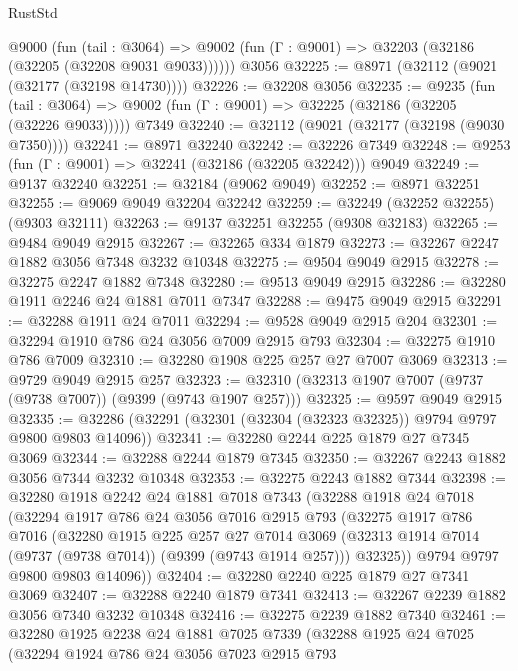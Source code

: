 \begin{lexlean}{RustStd}
\begin{coremodule}
    @9000
      (fun (tail : @3064) =>
      @9002 (fun (Γ : @9001) => @32203 (@32186 (@32205 (@32208 @9031 @9033))))))
    @3056
@32225 := @8971 (@32112 (@9021 (@32177 (@32198 @14730))))
@32226 := @32208 @3056
@32235 := @9235
    (fun (tail : @3064) => @9002 (fun (Γ : @9001) => @32225 (@32186 (@32205 (@32226 @9033)))))
    @7349
@32240 := @32112 (@9021 (@32177 (@32198 (@9030 @7350))))
@32241 := @8971 @32240
@32242 := @32226 @7349
@32248 := @9253 (fun (Γ : @9001) => @32241 (@32186 (@32205 @32242))) @9049
@32249 := @9137 @32240
@32251 := @32184 (@9062 @9049)
@32252 := @8971 @32251
@32255 := @9069 @9049 @32204 @32242
@32259 := @32249 (@32252 @32255) (@9303 @32111)
@32263 := @9137 @32251 @32255 (@9308 @32183)
@32265 := @9484 @9049 @2915
@32267 := @32265 @334 @1879
@32273 := @32267 @2247 @1882 @3056 @7348 @3232 @10348
@32275 := @9504 @9049 @2915
@32278 := @32275 @2247 @1882 @7348
@32280 := @9513 @9049 @2915
@32286 := @32280 @1911 @2246 @24 @1881 @7011 @7347
@32288 := @9475 @9049 @2915
@32291 := @32288 @1911 @24 @7011
@32294 := @9528 @9049 @2915 @204
@32301 := @32294 @1910 @786 @24 @3056 @7009 @2915 @793
@32304 := @32275 @1910 @786 @7009
@32310 := @32280 @1908 @225 @257 @27 @7007 @3069
@32313 := @9729 @9049 @2915 @257
@32323 := @32310 (@32313 @1907 @7007 (@9737 (@9738 @7007)) (@9399 (@9743 @1907 @257)))
@32325 := @9597 @9049 @2915
@32335 := @32286 (@32291 (@32301 (@32304 (@32323 @32325)) @9794 @9797 @9800 @9803 @14096))
@32341 := @32280 @2244 @225 @1879 @27 @7345 @3069
@32344 := @32288 @2244 @1879 @7345
@32350 := @32267 @2243 @1882 @3056 @7344 @3232 @10348
@32353 := @32275 @2243 @1882 @7344
@32398 := @32280
    @1918
    @2242
    @24
    @1881
    @7018
    @7343
    (@32288
      @1918
      @24
      @7018
      (@32294
        @1917
        @786
        @24
        @3056
        @7016
        @2915
        @793
        (@32275
          @1917
          @786
          @7016
          (@32280
            @1915
            @225
            @257
            @27
            @7014
            @3069
            (@32313 @1914 @7014 (@9737 (@9738 @7014)) (@9399 (@9743 @1914 @257)))
            @32325))
        @9794
        @9797
        @9800
        @9803
        @14096))
@32404 := @32280 @2240 @225 @1879 @27 @7341 @3069
@32407 := @32288 @2240 @1879 @7341
@32413 := @32267 @2239 @1882 @3056 @7340 @3232 @10348
@32416 := @32275 @2239 @1882 @7340
@32461 := @32280
    @1925
    @2238
    @24
    @1881
    @7025
    @7339
    (@32288
      @1925
      @24
      @7025
      (@32294
        @1924
        @786
        @24
        @3056
        @7023
        @2915
        @793

\end{coremodule}
\end{lexlean}
